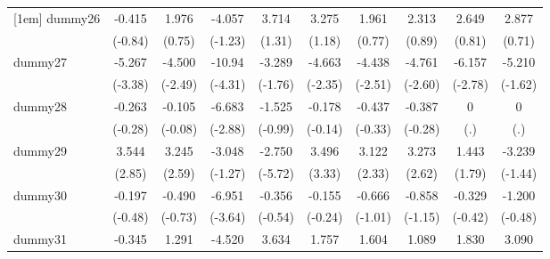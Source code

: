 {\begin{tabular}{l*{9}{c}}
[1em]
dummy26     &      -0.415         &       1.976         &      -4.057         &       3.714         &       3.275         &       1.961         &       2.313         &       2.649         &       2.877         \\
            &     (-0.84)         &      (0.75)         &     (-1.23)         &      (1.31)         &      (1.18)         &      (0.77)         &      (0.89)         &      (0.81)         &      (0.71)         \\
[1em]
dummy27     &      -5.267\sym{***}&      -4.500\sym{*}  &      -10.94\sym{***}&      -3.289         &      -4.663\sym{*}  &      -4.438\sym{*}  &      -4.761\sym{**} &      -6.157\sym{**} &      -5.210         \\
            &     (-3.38)         &     (-2.49)         &     (-4.31)         &     (-1.76)         &     (-2.35)         &     (-2.51)         &     (-2.60)         &     (-2.78)         &     (-1.62)         \\
[1em]
dummy28     &      -0.263         &      -0.105         &      -6.683\sym{**} &      -1.525         &      -0.178         &      -0.437         &      -0.387         &           0         &           0         \\
            &     (-0.28)         &     (-0.08)         &     (-2.88)         &     (-0.99)         &     (-0.14)         &     (-0.33)         &     (-0.28)         &         (.)         &         (.)         \\
[1em]
dummy29     &       3.544\sym{**} &       3.245\sym{**} &      -3.048         &      -2.750\sym{***}&       3.496\sym{***}&       3.122\sym{*}  &       3.273\sym{**} &       1.443         &      -3.239         \\
            &      (2.85)         &      (2.59)         &     (-1.27)         &     (-5.72)         &      (3.33)         &      (2.33)         &      (2.62)         &      (1.79)         &     (-1.44)         \\
[1em]
dummy30     &      -0.197         &      -0.490         &      -6.951\sym{***}&      -0.356         &      -0.155         &      -0.666         &      -0.858         &      -0.329         &      -1.200         \\
            &     (-0.48)         &     (-0.73)         &     (-3.64)         &     (-0.54)         &     (-0.24)         &     (-1.01)         &     (-1.15)         &     (-0.42)         &     (-0.48)         \\
[1em]
dummy31     &      -0.345         &       1.291         &      -4.520         &       3.634         &       1.757         &       1.604         &       1.089         &       1.830         &       3.090         \\

\end{tabular}}
